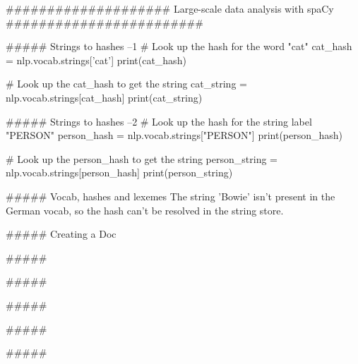 ####################   Large-scale data analysis with spaCy   ########################


##### Strings to hashes  --1
# Look up the hash for the word "cat"
cat_hash = nlp.vocab.strings['cat']
print(cat_hash)

# Look up the cat_hash to get the string
cat_string = nlp.vocab.strings[cat_hash]
print(cat_string)



##### Strings to hashes --2
# Look up the hash for the string label "PERSON"
person_hash = nlp.vocab.strings["PERSON"]
print(person_hash)

# Look up the person_hash to get the string
person_string = nlp.vocab.strings[person_hash]
print(person_string)


##### Vocab, hashes and lexemes
The string 'Bowie' isn't present in the German vocab, so the hash can't be resolved in the string store.


##### Creating a Doc




##### 




##### 




##### 




##### 




##### 




